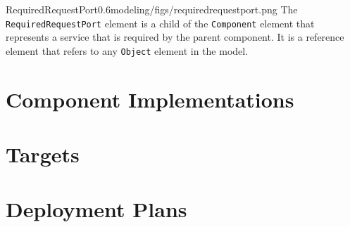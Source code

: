 \begin{modelelement}{RequiredRequestPort}{0.6}{modeling/figs/requiredrequestport.png}
The \texttt{RequiredRequestPort} element is a child of the \texttt{Component}
element that represents a service that is required by the parent component.
It is a reference element that refers to any \texttt{Object} element in
the model.
\end{modelelement}

\section{Component Implementations}

\section{Targets}

\section{Deployment Plans}

